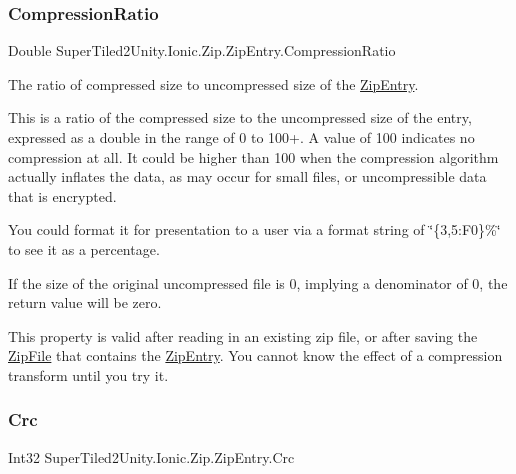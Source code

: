 \subsubsection{\texorpdfstring{Compression\+Ratio}{CompressionRatio}}
{\footnotesize\ttfamily Double Super\+Tiled2\+Unity.\+Ionic.\+Zip.\+Zip\+Entry.\+Compression\+Ratio\hspace{0.3cm}{\ttfamily [get]}}



The ratio of compressed size to uncompressed size of the \mbox{\hyperlink{class_super_tiled2_unity_1_1_ionic_1_1_zip_1_1_zip_entry}{Zip\+Entry}}. 

This is a ratio of the compressed size to the uncompressed size of the entry, expressed as a double in the range of 0 to 100+. A value of 100 indicates no compression at all. It could be higher than 100 when the compression algorithm actually inflates the data, as may occur for small files, or uncompressible data that is encrypted. 

You could format it for presentation to a user via a format string of \char`\"{}\{3,5\+:\+F0\}\%\char`\"{} to see it as a percentage. 

If the size of the original uncompressed file is 0, implying a denominator of 0, the return value will be zero. 

This property is valid after reading in an existing zip file, or after saving the {\ttfamily \mbox{\hyperlink{class_super_tiled2_unity_1_1_ionic_1_1_zip_1_1_zip_file}{Zip\+File}}} that contains the \mbox{\hyperlink{class_super_tiled2_unity_1_1_ionic_1_1_zip_1_1_zip_entry}{Zip\+Entry}}. You cannot know the effect of a compression transform until you try it. \mbox{\label{class_super_tiled2_unity_1_1_ionic_1_1_zip_1_1_zip_entry_a4b24fadb05fd70564b92f6618343aa87}} 
\subsubsection{\texorpdfstring{Crc}{Crc}}
{\footnotesize\ttfamily Int32 Super\+Tiled2\+Unity.\+Ionic.\+Zip.\+Zip\+Entry.\+Crc\hspace{0.3cm}{\ttfamily [get]}}



